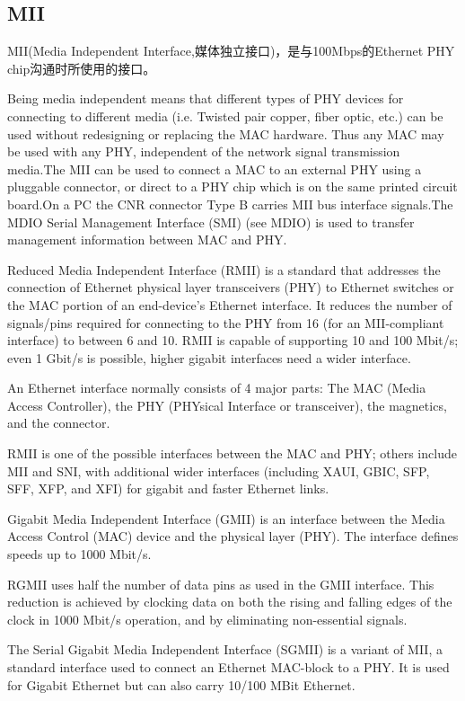 \subsection{MII}
MII(Media Independent Interface,媒体独立接口)，是与100Mbps的Ethernet PHY chip沟通时所使用的接口。

Being media independent means that different types of PHY devices for connecting to different media (i.e. Twisted pair copper, fiber optic, etc.) can be used without redesigning or replacing the MAC hardware. Thus any MAC may be used with any PHY, independent of the network signal transmission media.The MII can be used to connect a MAC to an external PHY using a pluggable connector, or direct to a PHY chip which is on the same printed circuit board.On a PC the CNR connector Type B carries MII bus interface signals.The MDIO Serial Management Interface (SMI) (see MDIO) is used to transfer management information between MAC and PHY.

Reduced Media Independent Interface (RMII) is a standard that addresses the connection of Ethernet physical layer transceivers (PHY) to Ethernet switches or the MAC portion of an end-device's Ethernet interface. It reduces the number of signals/pins required for connecting to the PHY from 16 (for an MII-compliant interface) to between 6 and 10. RMII is capable of supporting 10 and 100 Mbit/s; even 1 Gbit/s is possible, higher gigabit interfaces need a wider interface.

An Ethernet interface normally consists of 4 major parts: The MAC (Media Access Controller), the PHY (PHYsical Interface or transceiver), the magnetics, and the connector.

RMII is one of the possible interfaces between the MAC and PHY; others include MII and SNI, with additional wider interfaces (including XAUI, GBIC, SFP, SFF, XFP, and XFI) for gigabit and faster Ethernet links.

Gigabit Media Independent Interface (GMII) is an interface between the Media Access Control (MAC) device and the physical layer (PHY). The interface defines speeds up to 1000 Mbit/s.

RGMII uses half the number of data pins as used in the GMII interface. This reduction is achieved by clocking data on both the rising and falling edges of the clock in 1000 Mbit/s operation, and by eliminating non-essential signals.

The Serial Gigabit Media Independent Interface (SGMII) is a variant of MII, a standard interface used to connect an Ethernet MAC-block to a PHY. It is used for Gigabit Ethernet but can also carry 10/100 MBit Ethernet.

